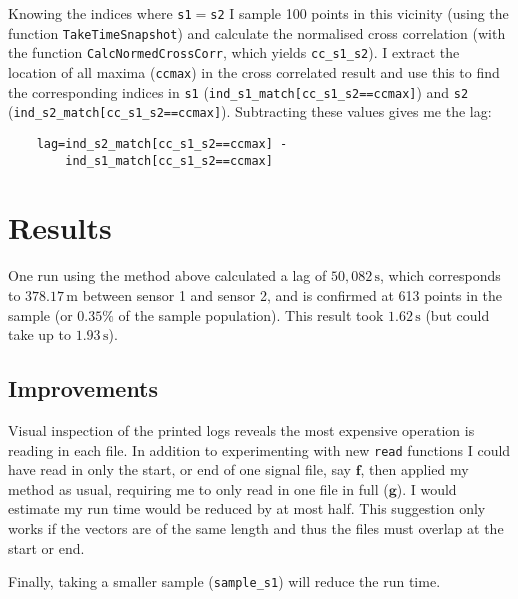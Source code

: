 \documentclass[prb,11pt,twocolumn]{revtex4-1}
\begin{document}
Knowing the indices where \texttt{s1}$=$\texttt{s2} I sample 100 points in this vicinity (using the function \texttt{TakeTimeSnapshot}) and calculate the normalised cross correlation (with the function \texttt{CalcNormedCrossCorr}, which yields \texttt{cc\_s1\_s2}). I extract the location of all maxima (\texttt{ccmax}) in the cross correlated result and use this to find the corresponding indices in \texttt{s1} (\texttt{ind\_s1\_match[cc\_s1\_s2==ccmax]}) and \texttt{s2} (\texttt{ind\_s2\_match[cc\_s1\_s2==ccmax]}). Subtracting these values gives me the lag:

\begin{verbatim}
    lag=ind_s2_match[cc_s1_s2==ccmax] -
        ind_s1_match[cc_s1_s2==ccmax]   
\end{verbatim}

\section{Results}
One run using the method above calculated a lag of $50,082\,\mathrm{s}$, which corresponds to $378.17\,\mathrm{m}$ between sensor 1 and sensor 2, and is confirmed at 613 points in the sample (or $0.35\%$ of the sample population). This result took $1.62\,\mathrm{s}$ (but could take up to $1.93\,\mathrm{s}$).

\subsection{Improvements}
Visual inspection of the printed logs reveals the most expensive operation is reading in each file. In addition to experimenting with new \texttt{read} functions I could have read in only the start, or end of one signal file, say $\mathbf{f}$, then applied my method as usual, requiring me to only read in one file in full ($\mathbf{g}$). I would estimate my run time would be reduced by at most half. This suggestion only works if the vectors are of the same length and thus the files must overlap at the start or end. 

Finally, taking a smaller sample (\texttt{sample\_s1}) will reduce the run time.
\end{document}
